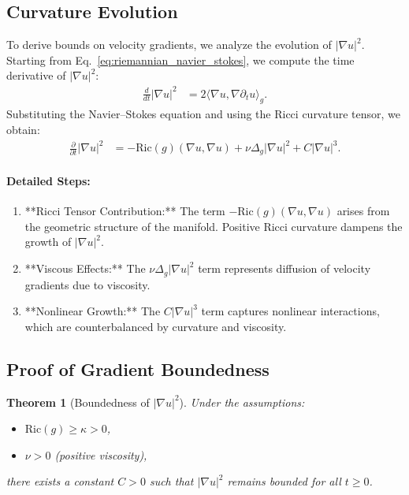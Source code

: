 \documentclass[12pt]{article}
\newtheorem{theorem}{Theorem}[section]
\theoremstyle{definition}
\begin{document}
\subsection{Curvature Evolution}
To derive bounds on velocity gradients, we analyze the evolution of $|\nabla u|^2$. Starting from Eq.~\eqref{eq:riemannian_navier_stokes}, we compute the time derivative of $|\nabla u|^2$:
\begin{align}
\frac{d}{dt} |\nabla u|^2 &= 2 \langle \nabla u, \nabla \partial_t u \rangle_g. \label{eq:gradient_time_evolution}
\end{align}
Substituting the Navier--Stokes equation and using the Ricci curvature tensor, we obtain:
\begin{align}
\frac{\partial}{\partial t} |\nabla u|^2 &= - \text{Ric}(g)(\nabla u, \nabla u) + \nu \Delta_g |\nabla u|^2 + C |\nabla u|^3. \label{eq:ricci_curvature_evolution}
\end{align}

\paragraph{Detailed Steps:}
\begin{enumerate}
    \item **Ricci Tensor Contribution:**
    The term $- \text{Ric}(g)(\nabla u, \nabla u)$ arises from the geometric structure of the manifold. Positive Ricci curvature dampens the growth of $|\nabla u|^2$.
    \item **Viscous Effects:**
    The $\nu \Delta_g |\nabla u|^2$ term represents diffusion of velocity gradients due to viscosity.
    \item **Nonlinear Growth:**
    The $C |\nabla u|^3$ term captures nonlinear interactions, which are counterbalanced by curvature and viscosity.
\end{enumerate}

\subsection{Proof of Gradient Boundedness}
\begin{theorem}[Boundedness of $|\nabla u|^2$]
Under the assumptions:
\begin{itemize}
    \item $\text{Ric}(g) \geq \kappa > 0$,
    \item $\nu > 0$ (positive viscosity),
\end{itemize}
there exists a constant $C > 0$ such that $|\nabla u|^2$ remains bounded for all $t \geq 0$.
\end{theorem}
\end{document}
